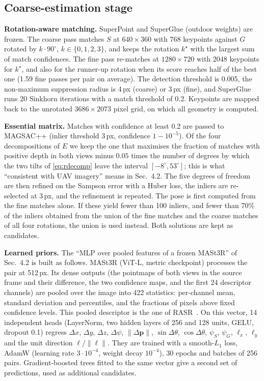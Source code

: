 \documentclass[10pt,twocolumn,letterpaper]{article}
\newcommand{\dth}{\Delta\theta}
\newcommand{\dpsi}{\Delta\psi}
\newcommand{\dpv}{\Delta\mathbf{p}}
\newcommand{\lv}{\bm{\ell}}
\begin{document}
\subsection{Coarse-estimation stage}
\label{sec:coarse}

\noindent\textbf{Rotation-aware matching.} SuperPoint and SuperGlue (outdoor weights) are frozen. The coarse pass matches $S$ at $640{\times}360$ with 768 keypoints against $G$ rotated by $k\cdot90^\circ$, $k\in\{0,1,2,3\}$, and keeps the rotation $k^\star$ with the largest sum of match confidences. The fine pass re-matches at $1280{\times}720$ with 2048 keypoints for $k^\star$, and also for the runner-up rotation when its score reaches half of the best one (1.59 fine passes per pair on average). The detection threshold is 0.005, the non-maximum suppression radius is 4\,px (coarse) or 3\,px (fine), and SuperGlue runs 20 Sinkhorn iterations with a match threshold of 0.2. Keypoints are mapped back to the unrotated $3686{\times}2073$ pixel grid, on which all geometry is computed.

\noindent\textbf{Essential matrix.} Matches with confidence at least 0.2 are passed to MAGSAC++ (inlier threshold 3\,px, confidence $1{-}10^{-5}$). Of the four decompositions of $E$ we keep the one that maximises the fraction of matches with positive depth in both views minus $0.05$ times the number of degrees by which the two tilts of \cref{eq:rdecomp} leave the interval $[-8^\circ,53^\circ]$; this is what ``consistent with UAV imagery'' means in Sec.~4.2. The five degrees of freedom are then refined on the Sampson error with a Huber loss, the inliers are re-selected at 3\,px, and the refinement is repeated. The pose is first computed from the fine matches alone. If these yield fewer than 100 inliers, and fewer than 70\% of the inliers obtained from the union of the fine matches and the coarse matches of all four rotations, the union is used instead. Both solutions are kept as candidates.

\noindent\textbf{Learned priors.} The ``MLP over pooled features of a frozen MASt3R'' of Sec.~4.2 is built as follows. MASt3R (ViT-L, metric checkpoint) processes the pair at 512\,px. Its dense outputs (the pointmaps of both views in the source frame and their difference, the two confidence maps, and the first 24 descriptor channels) are pooled over the image into 422 statistics: per-channel mean, standard deviation and percentiles, and the fractions of pixels above fixed confidence levels. This pooled descriptor is the one of RASR~\cite{liang2026rasr}. On this vector, 14 independent heads (LayerNorm, two hidden layers of 256 and 128 units, GELU, dropout 0.1) regress $\Delta x$, $\Delta y$, $\Delta z$, $\dpsi$, $\|\dpv\|$, $\sin\dth$, $\cos\dth$, $\psi_S$, $\psi_G$, $\ell_x$, $\ell_y$ and the unit direction $\lv/\|\lv\|$. They are trained with a smooth-$L_1$ loss, AdamW (learning rate $3{\cdot}10^{-4}$, weight decay $10^{-4}$), 30 epochs and batches of 256 pairs. Gradient-boosted trees fitted to the same vector give a second set of predictions, used as additional candidates.
\end{document}
